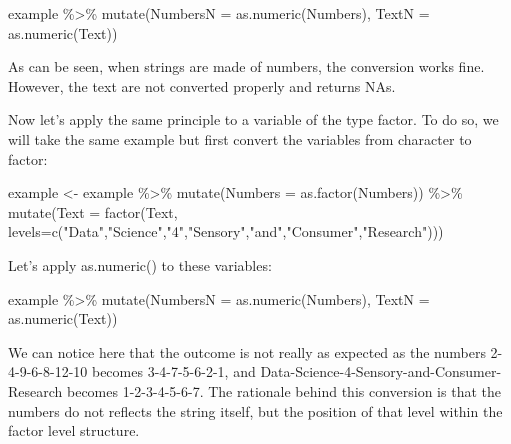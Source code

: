 \documentclass[
]{book}
\newenvironment{Shaded}{\begin{snugshade}}{\end{snugshade}}
\newcommand{\AttributeTok}[1]{\textcolor[rgb]{0.77,0.63,0.00}{#1}}
\newcommand{\FunctionTok}[1]{\textcolor[rgb]{0.00,0.00,0.00}{#1}}
\newcommand{\NormalTok}[1]{#1}
\newcommand{\OtherTok}[1]{\textcolor[rgb]{0.56,0.35,0.01}{#1}}
\newcommand{\SpecialCharTok}[1]{\textcolor[rgb]{0.00,0.00,0.00}{#1}}
\newcommand{\StringTok}[1]{\textcolor[rgb]{0.31,0.60,0.02}{#1}}
\begin{document}
\begin{Shaded}
\begin{Highlighting}[]
\NormalTok{example }\SpecialCharTok{\%\textgreater{}\%} 
  \FunctionTok{mutate}\NormalTok{(}\AttributeTok{NumbersN =} \FunctionTok{as.numeric}\NormalTok{(Numbers), }\AttributeTok{TextN =} \FunctionTok{as.numeric}\NormalTok{(Text))}
\end{Highlighting}
\end{Shaded}

As can be seen, when strings are made of numbers, the conversion works fine. However, the text are not converted properly and returns NAs.

Now let's apply the same principle to a variable of the type factor. To do so, we will take the same example but first convert the variables from character to factor:

\begin{Shaded}
\begin{Highlighting}[]
\NormalTok{example }\OtherTok{\textless{}{-}}\NormalTok{ example }\SpecialCharTok{\%\textgreater{}\%} 
  \FunctionTok{mutate}\NormalTok{(}\AttributeTok{Numbers =} \FunctionTok{as.factor}\NormalTok{(Numbers)) }\SpecialCharTok{\%\textgreater{}\%} 
  \FunctionTok{mutate}\NormalTok{(}\AttributeTok{Text =} \FunctionTok{factor}\NormalTok{(Text, }\AttributeTok{levels=}\FunctionTok{c}\NormalTok{(}\StringTok{"Data"}\NormalTok{,}\StringTok{"Science"}\NormalTok{,}\StringTok{"4"}\NormalTok{,}\StringTok{"Sensory"}\NormalTok{,}\StringTok{"and"}\NormalTok{,}\StringTok{"Consumer"}\NormalTok{,}\StringTok{"Research"}\NormalTok{)))}
\end{Highlighting}
\end{Shaded}

Let's apply as.numeric() to these variables:

\begin{Shaded}
\begin{Highlighting}[]
\NormalTok{example }\SpecialCharTok{\%\textgreater{}\%} 
  \FunctionTok{mutate}\NormalTok{(}\AttributeTok{NumbersN =} \FunctionTok{as.numeric}\NormalTok{(Numbers), }\AttributeTok{TextN =} \FunctionTok{as.numeric}\NormalTok{(Text))}
\end{Highlighting}
\end{Shaded}

We can notice here that the outcome is not really as expected as the numbers 2-4-9-6-8-12-10 becomes 3-4-7-5-6-2-1, and Data-Science-4-Sensory-and-Consumer-Research becomes 1-2-3-4-5-6-7. The rationale behind this conversion is that the numbers do not reflects the string itself, but the position of that level within the factor level structure.
\end{document}
